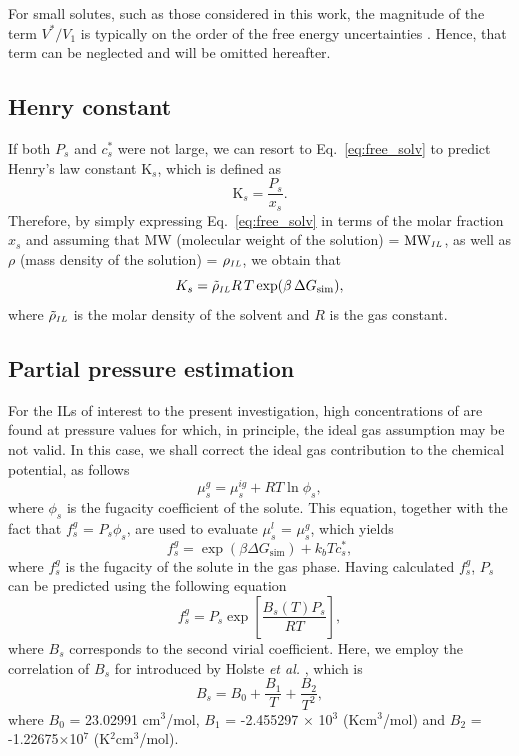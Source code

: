 \documentclass[3p,twocolumn]{elsarticle}
\begin{document}
For small solutes, such as those considered in this work, the magnitude of the term $V^{\ast}/V_1$ is typically on the order of the free energy uncertainties \cite{Shirts_2003}.
Hence, that term can be neglected and will be omitted hereafter.

\subsection*{Henry constant}
If both $P_s$ and $c_s^{\ast}$ were not large, we can resort to Eq.~\eqref{eq:free_solv} to predict Henry's law constant $\text{K}_s$, which is defined as \cite{Prausnitz}
\begin{equation}
\text{K}_s =\frac{P_s}{x_s}.
\end{equation}
Therefore, by simply expressing Eq.~\eqref{eq:free_solv} in terms of the molar fraction $x_s$ and assuming that MW (molecular weight of the solution) = $\text{MW}_{\scaleto{IL}{4pt}}$, as well as $\rho$ (mass density of the solution) = $\rho_{\scaleto{IL}{4pt}}$, we obtain that
\begin{equation}
\label{eq:henry_eq}
K_s = \tilde{\rho}_{\scaleto{IL}{4pt}} R \, T \exp(\beta \, \Delta G_{\text{sim}}),
\end{equation}
where $\tilde{\rho}_{\scaleto{IL}{4pt}}$ is the molar density of the solvent and $R$ is the gas constant.

\subsection*{Partial pressure estimation}
\label{sec:partial_pressure}

For the ILs of interest to the present investigation, high concentrations of  are found at pressure values for which, in principle, the ideal gas assumption may be not valid.
In this case, we shall correct the ideal gas contribution to the chemical potential, as follows
\begin{equation}
\label{eq:mu_gas_real}
\mu^{g}_s = \mu^{ig}_s + RT \ln \phi_s,
\end{equation}
where $\phi_s$ is the fugacity coefficient of the solute.
This equation, together with the fact that $f^{g}_s$ = $P_s \phi_s$, are used to evaluate $\mu^{l}_s$ = $\mu^{g}_s$, which yields
\begin{equation}
\label{eq:fgas_d}
f^{g}_s = \exp  \left( \beta \Delta G_{\text{sim}} \right) +  k_b T c_s^{\ast}, 
\end{equation}
where $f^{g}_s$ is the fugacity of the solute in the gas phase.
Having calculated $f^{g}_s$, $P_s$ can be predicted using the following equation
\begin{equation}
\label{eq:fgas}
f^{g}_s = P_s \exp\left[ \frac{B_s(T) P_s}{R T} \right],
\end{equation}
where $B_s$ corresponds to the second virial coefficient.
Here, we employ the correlation of $B_s$ for  introduced by Holste \textit{et al.} \cite{Holste_1987}, which is
\begin{equation}
B_s = B_0 + \frac{B_1}{T} + \frac{B_2}{T^2},
\end{equation}
where $B_0$ = 23.02991 cm$^3$/mol, $B_1$ = -2.455297 $\times$ 10$^3$ (Kcm$^3$/mol) and $B_2$ = -1.22675$\times$10$^7$ (K$^2$cm$^3$/mol).
\end{document}
